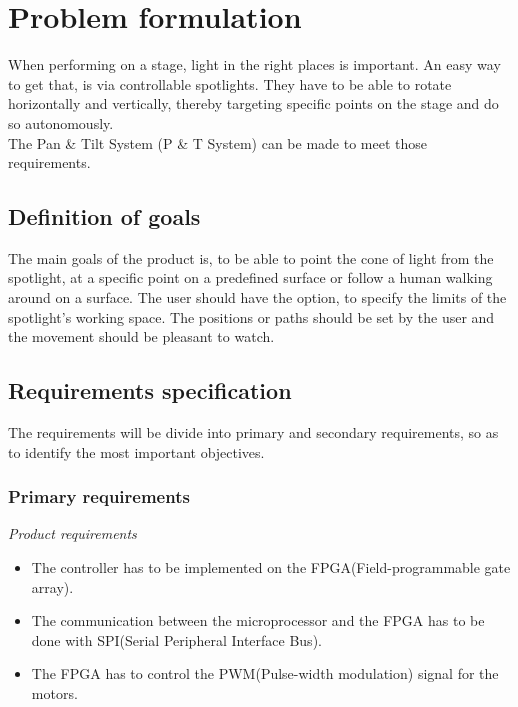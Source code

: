\newpage

\section{Problem formulation}
When performing on a stage, light in the right places is important. An easy way to get that, is via controllable spotlights. They have to be able to rotate horizontally and vertically, thereby targeting specific points on the stage and do so autonomously.\\
The Pan \& Tilt System (P \& T System) can be made to meet those requirements.


\subsection{Definition of goals}
The main goals of the product is, to be able to point the cone of light from the spotlight, at a specific point on a predefined surface or follow a human walking around on a surface. The user should have the option, to specify the limits of the spotlight's working space. The positions or paths should be set by the user and the movement should be pleasant to watch.


\subsection{Requirements specification}
The requirements will be divide into primary and secondary requirements, so as to identify the most important objectives.


\subsubsection{Primary requirements}

\textit{Product requirements}

\begin{itemize}

\item The controller has to be implemented on the FPGA(Field-programmable gate array).

\item The communication between the microprocessor and the FPGA has to be done with SPI(Serial Peripheral Interface Bus).

\item The FPGA has to control the PWM(Pulse-width modulation) signal for the motors.
\end{itemize}

